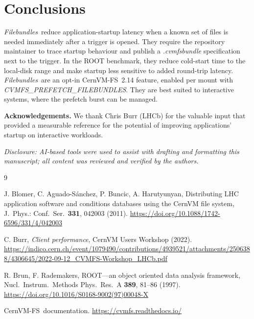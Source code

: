 \documentclass{webofc}
\newcommand{\cvmfs}{CernVM-FS}
\newcommand{\Filebundles}{\emph{Filebundles}}
\begin{document}
\section{Conclusions}
\label{sec-conclusions}

\Filebundles\ reduce application-startup latency when a known set of files
is needed immediately after a trigger is opened. They require the
repository maintainer to trace startup behaviour and publish a
\emph{.cvmfsbundle} specification next to the trigger. In the ROOT
benchmark, they reduce cold-start time to the local-disk range and make
startup less sensitive to added round-trip latency. \Filebundles\ are an
opt-in \cvmfs~2.14 feature, enabled per mount with
\emph{CVMFS\_PREFETCH\_FILEBUNDLES}. They are best suited to
interactive systems, where the prefetch burst can be managed.

\vspace{0.5em}
\noindent\textbf{Acknowledgements.} We thank Chris Burr (LHCb) for the
valuable input that provided a measurable reference for the potential of improving applications' startup on interactive workloads.

\vspace{0.3em}
\noindent\emph{Disclosure: AI-based tools were used to assist with
drafting and formatting this manuscript; all content was reviewed and
verified by the authors.}

\begin{thebibliography}{9}

J. Blomer, C. Aguado-S\'anchez, P. Buncic, A. Harutyunyan,
Distributing LHC application software and conditions databases using
the CernVM file system, J.\ Phys.: Conf.\ Ser.\ \textbf{331}, 042003
(2011). \url{https://doi.org/10.1088/1742-6596/331/4/042003}

C. Burr, \textit{Client performance}, CernVM Users Workshop (2022).
\url{https://indico.cern.ch/event/1079490/contributions/4939521/attachments/2506388/4306645/2022-09-12_CVMFS-Workshop_LHCb.pdf}

R. Brun, F. Rademakers, ROOT---an object oriented data analysis
framework, Nucl.\ Instrum.\ Methods Phys.\ Res.\ A \textbf{389},
81--86 (1997). \url{https://doi.org/10.1016/S0168-9002(97)00048-X}

\cvmfs\ documentation. \url{https://cvmfs.readthedocs.io/}

\end{thebibliography}
\end{document}
